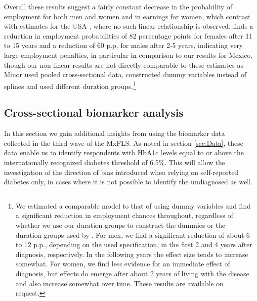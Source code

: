 \documentclass[12pt,english]{article}
\begin{document}
Overall these results suggest a fairly constant decrease in the probability of employment for both men and women and in earnings for women, which contrast with estimates for the \ac{USA} \parencite{Minor2013}, where no such linear relationship is observed.  \textcite{Minor2013} finds a reduction in employment probabilities of 82 \ac{percentage points} for females after 11 to 15 years and a reduction of 60 \ac{p.p.} for males after 2-5 years, indicating very large employment penalties, in particular in comparison to our results for Mexico, though our non-linear results are not directly comparable to these estimates as Minor used pooled cross-sectional data, constructed dummy variables instead of splines and used different duration groups.\footnote{We estimated a comparable model to that of \textcite{Minor2013} using dummy variables and find a significant reduction in employment chances throughout, regardless of whether we use our duration groups to construct the dummies or the duration groups used by \textcite{Minor2013}. For men, we find a significant reduction of about 6 to 12 \ac{p.p.}, depending on the used specification, in the first 2 and 4 years after diagnosis, respectively. In the following years the effect size tends to increase somewhat. For women, we find less evidence for an immediate effect of diagnosis, but effects do emerge after about 2 years of living with the disease and also increase somewhat over time. These results are available on request.}
\FloatBarrier

\subsection{Cross-sectional biomarker analysis}


In this section we gain additional insights from using the biomarker data collected in the
third wave of the \ac{MxFLS}. As noted in section \ref{sec:Data}, these data enable us to identify respondents with
\ac{HbA1c} levels equal to or above the internationally recognized diabetes threshold of 6.5\%. This will allow the investigation of the direction of bias introduced when relying on self-reported diabetes only, in cases where it is not possible to identify the undiagnosed as well.
\end{document}
